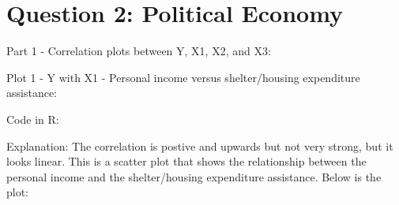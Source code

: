 \documentclass[12pt,letterpaper]{article}
\begin{document}
\newpage

	\section*{Question 2: Political Economy}

	Part 1 - Correlation plots between Y, X1, X2, and X3: 
\vspace{.3cm}
\begin{description}
	\item Plot 1 - Y with X1 - Personal income versus shelter/housing expenditure assistance:
	\item Code in R:
	  
	
	\item Explanation: The correlation is postive and upwards but not very strong, but it looks linear. This is a scatter plot that shows the relationship between the personal income and the shelter/housing expenditure assistance. Below is the plot:
\end{description}
\end{document}
